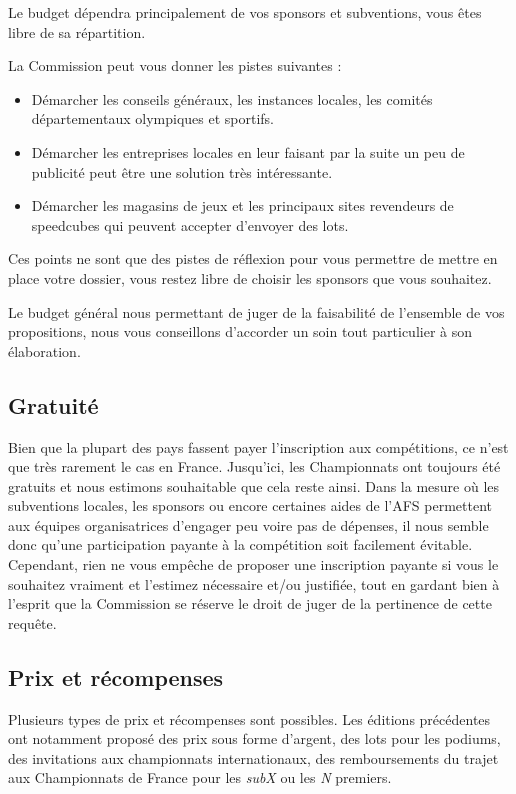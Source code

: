 \documentclass[a4paper,12pt]{scrartcl}
\begin{document}
Le budget dépendra principalement de vos sponsors et subventions, vous êtes libre de sa répartition.

La Commission peut vous donner les pistes suivantes :

\begin{itemize}
    \item Démarcher les conseils généraux, les instances locales, les comités départementaux olympiques et sportifs.
    \item Démarcher les entreprises locales en leur faisant par la suite un peu de publicité peut être une solution très intéressante.
    \item Démarcher les magasins de jeux et les principaux sites revendeurs de speedcubes qui peuvent accepter d'envoyer des lots.
\end{itemize}

Ces points ne sont que des pistes de réflexion pour vous permettre de mettre en place votre dossier, vous restez libre de choisir les sponsors que vous souhaitez. 

Le budget général nous permettant de juger de la faisabilité de l'ensemble de vos propositions, nous vous conseillons d'accorder un soin tout particulier à son élaboration.


\subsection*{Gratuité}
Bien que la plupart des pays fassent payer l'inscription aux compétitions, ce n'est que très rarement le cas en France. Jusqu'ici, les Championnats ont toujours été gratuits et nous estimons souhaitable que cela reste ainsi. Dans la mesure où les subventions locales, les sponsors ou encore certaines aides de l'AFS permettent aux équipes organisatrices d'engager peu voire pas de dépenses, il nous semble donc qu'une participation payante à la compétition soit facilement évitable. Cependant, rien ne vous empêche de proposer une inscription payante si vous le souhaitez vraiment et l'estimez nécessaire et/ou justifiée, tout en gardant bien à l'esprit que la Commission se réserve le droit de juger de la pertinence de cette requête.


\subsection*{Prix et récompenses}

Plusieurs types de prix et récompenses sont possibles. Les éditions précédentes ont notamment proposé des prix sous forme d'argent, des lots pour les podiums, des invitations aux championnats internationaux, des remboursements du trajet aux Championnats de France pour les \emph{subX} ou les \emph{N} premiers.
\end{document}
